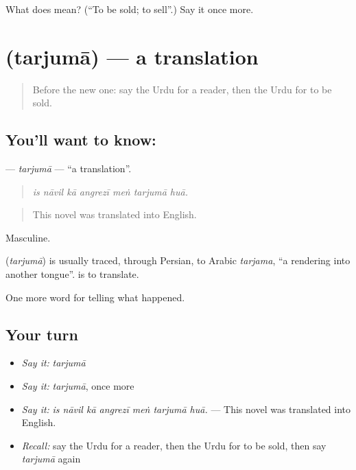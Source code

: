 \begin{tcolorbox}[breakable,colback=teal!4,colframe=teal!35!black,title={Before you move on}]
What does  mean? (\textquotedblleft{}To be sold; to sell\textquotedblright{}.) Say it once more.
\end{tcolorbox}
\section[\texorpdfstring{\ur{ترجمہ} (tarjumā)}{ترجمہ (tarjumā)}]{ (tarjumā) — a translation}

\label{lesson:UR-C330-tarjuma}



\begin{quote}
Before the new one: say the Urdu for a reader, then the Urdu for to be sold.
\end{quote}

\subsection*{You'll want to know: }
\textbf{} — \emph{tarjumā} — \textquotedblleft{}a translation\textquotedblright{}.

\begin{quote}
      
\end{quote}

\begin{quote}
\emph{is nāvil kā angrezī meṅ tarjumā huā.}
\end{quote}

\begin{quote}
This novel was translated into English.
\end{quote}

Masculine.

\begin{cousinweb}
\textbf{} (\emph{tarjumā}) is usually traced, through Persian, to Arabic \emph{tarjama}, \textquotedblleft{}a rendering into another tongue\textquotedblright{}. \textbf{ } is to translate.
\end{cousinweb}

\begin{grammarlens}[title={What you've built}]
One more word for telling what happened.
\end{grammarlens}

\subsection*{Your turn}
\begin{itemize}
\raggedright
  \item \emph{Say it:} \emph{tarjumā}
  \item \emph{Say it:} \emph{tarjumā}, once more
  \item \emph{Say it:} \emph{is nāvil kā angrezī meṅ tarjumā huā.} — This novel was translated into English.
  \item \emph{Recall:} say the Urdu for a reader, then the Urdu for to be sold, then say \emph{tarjumā} again
\end{itemize}

